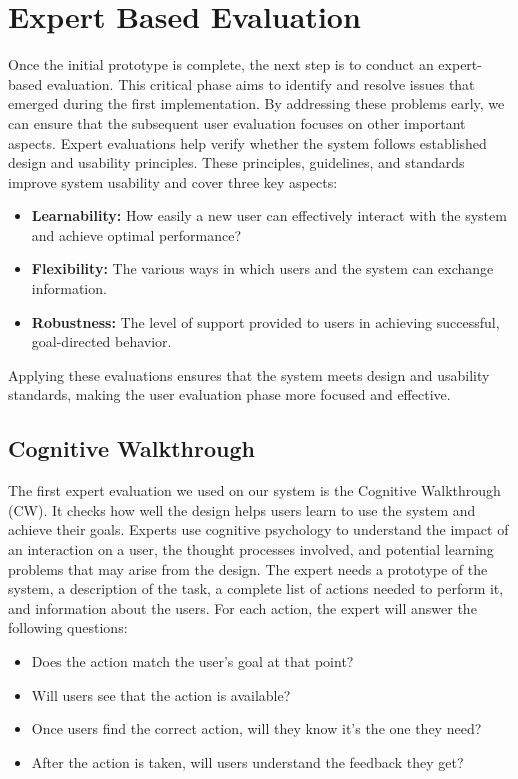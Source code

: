 \section{Expert Based Evaluation}
Once the initial prototype is complete, the next step is to conduct an expert-based evaluation. This critical phase aims to identify and resolve issues that emerged during the first implementation. By addressing these problems early, we can ensure that the subsequent user evaluation focuses on other important aspects.\newline\newline
Expert evaluations help verify whether the system follows established design and usability principles. These principles, guidelines, and standards improve system usability and cover three key aspects:
\begin{itemize}
	\item \textbf{Learnability:} How easily a new user can effectively interact with the system and achieve optimal performance?
	\item \textbf{Flexibility:} The various ways in which users and the system can exchange information.
	\item \textbf{Robustness:} The level of support provided to users in achieving successful, goal-directed behavior.
\end{itemize}
Applying these evaluations ensures that the system meets design and usability standards, making the user evaluation phase more focused and effective.
\subsection{Cognitive Walkthrough}
The first expert evaluation we used on our system is the Cognitive Walkthrough (CW). It checks how well the design helps users learn to use the system and achieve their goals. Experts use cognitive psychology to understand the impact of an interaction on a user, the thought processes involved, and potential learning problems that may arise from the design.
\newline
The expert needs a prototype of the system, a description of the task, a complete list of actions needed to perform it, and information about the users. For each action, the expert will answer the following questions:
\begin{itemize}
	\item Does the action match the user’s goal at that point?
	\item Will users see that the action is available?
	\item Once users find the correct action, will they know it’s the one they need?
	\item After the action is taken, will users understand the feedback they get?
\end{itemize}
\clearpage

